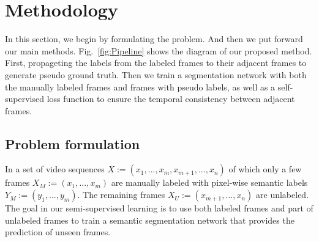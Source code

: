 \section{Methodology}
\label{sec:metho}
In this section, we begin by formulating the problem. 
%
And then we put forward our main methods.
%
Fig.~\ref{fig:Pipeline} shows the diagram of our proposed method.
%
First, propageting the labels from the labeled frames to their adjacent frames to generate pseudo ground truth.
Then we train a segmentation network with both the manually labeled frames and frames with pseudo labels, as well as a self-supervised loss function to ensure the temporal consistency between adjacent frames.

\subsection{Problem formulation}
In a set of video sequences $X := (x_1,...,x_m,x_{m+1},...,x_n)$ of which only a few frames $X_M := (x_1,...,x_m)$ are manually labeled with pixel-wise semantic labels $Y_M := (y_1,...,y_m)$. 
%
The remaining frames $X_U := (x_{m+1},...,x_n)$ are unlabeled.
%
The goal in our semi-supervised learning is to use both labeled frames and part of unlabeled frames to train a semantic segmentation network that provides the prediction of unseen frames.

